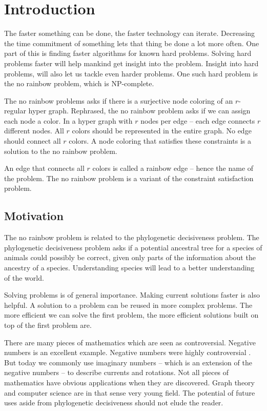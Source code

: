 \documentclass[msc,lith,english]{liuthesis}
\author{Edvard Thörnros}
\begin{document}
\chapter{Introduction}
\label{chaIntro}
The faster something can be done, the faster technology can iterate.
Decreasing the time commitment of something lets that thing be done a lot more often.
One part of this is finding faster algorithms for known hard problems.
Solving hard problems faster will help mankind get insight into the problem.
Insight into hard problems, will also let us tackle even harder problems.
One such hard problem is the no rainbow problem, which is NP-complete.

The no rainbow problems asks if there is a surjective node coloring of an $r$-regular hyper graph.
Rephrased, the no rainbow problem asks if we can assign each node a color.
In a hyper graph with $r$ nodes per edge -- each edge connects $r$ different nodes.
All $r$ colors should be represented in the entire graph.
No edge should connect all $r$ colors.
A node coloring that satisfies these constraints is a solution to the no rainbow problem.

An edge that connects all $r$ colors is called a rainbow edge -- hence the name of the problem.
The no rainbow problem is a variant of the constraint satisfaction problem. \cite{sourceNoRainbow}

\section{Motivation}
The no rainbow problem is related to the phylogenetic decisiveness problem. The
phylogenetic decisiveness problem asks if a potential ancestral tree for a
species of animals could possibly be correct, given only parts of the
information about the ancestry of a species.
Understanding species will lead to a better understanding of the world. \cite{sourcePhylogeneticDecisiveness} \cite{sourceNoRainbow}

Solving problems is of general importance. Making current solutions faster is also helpful.
A solution to a problem can be reused in more complex problems. The more
efficient we can solve the first problem, the more efficient solutions built on
top of the first problem are. 

There are many pieces of mathematics which are seen as controversial.
Negative numbers is an excellent example. Negative numbers were highly
controversial \cite{sourceNeg}. But today we commonly use imaginary numbers -- which is an extension of the negative numbers -- to
describe currents and rotations. Not all pieces of mathematics have obvious
applications when they are discovered. Graph theory and computer science are in
that sense very young field.
The potential of future uses aside from phylogenetic decisiveness should not elude the reader.
\end{document}
